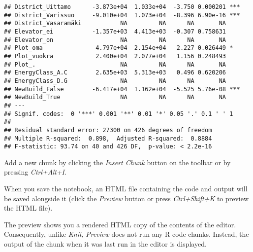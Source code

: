 \documentclass[
]{article}
\begin{document}
\begin{verbatim}
## District_Uittamo      -3.873e+04  1.033e+04  -3.750 0.000201 ***
## District_Varissuo     -9.010e+04  1.073e+04  -8.396 6.90e-16 ***
## District_Vasaramäki           NA         NA      NA       NA    
## Elevator_ei           -1.357e+03  4.413e+03  -0.307 0.758631    
## Elevator_on                   NA         NA      NA       NA    
## Plot_oma               4.797e+04  2.154e+04   2.227 0.026449 *  
## Plot_vuokra            2.400e+04  2.077e+04   1.156 0.248493    
## Plot_.                        NA         NA      NA       NA    
## EnergyClass_A.C        2.635e+03  5.313e+03   0.496 0.620206    
## EnergyClass_D.G               NA         NA      NA       NA    
## NewBuild_False        -6.417e+04  1.162e+04  -5.525 5.76e-08 ***
## NewBuild_True                 NA         NA      NA       NA    
## ---
## Signif. codes:  0 '***' 0.001 '**' 0.01 '*' 0.05 '.' 0.1 ' ' 1
## 
## Residual standard error: 27300 on 426 degrees of freedom
## Multiple R-squared:  0.898,  Adjusted R-squared:  0.8884 
## F-statistic: 93.74 on 40 and 426 DF,  p-value: < 2.2e-16
\end{verbatim}

Add a new chunk by clicking the \emph{Insert Chunk} button on the
toolbar or by pressing \emph{Ctrl+Alt+I}.

When you save the notebook, an HTML file containing the code and output
will be saved alongside it (click the \emph{Preview} button or press
\emph{Ctrl+Shift+K} to preview the HTML file).

The preview shows you a rendered HTML copy of the contents of the
editor. Consequently, unlike \emph{Knit}, \emph{Preview} does not run
any R code chunks. Instead, the output of the chunk when it was last run
in the editor is displayed.
\end{document}
